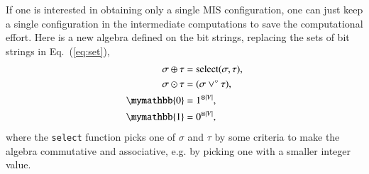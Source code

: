 \documentclass[onefignum, onetabnum]{siamart190516}
\newcommand{\<}{\langle}
\renewcommand{\>}{\rangle}
\newcommand{\Eq}[1]{Eq.~(\ref{#1})}
\newcommand{\App}[1]{Appendix~\ref{#1}}
\begin{document}
If one is interested in obtaining only a single MIS configuration, one can just keep a single configuration in the intermediate computations to save the computational effort.
Here is a new algebra defined on the bit strings, replacing the sets of bit strings in \Eq{eq:set}, 
%
\begin{equation}
\begin{split}
    \sigma \oplus \tau &= {\rm select}(\sigma, \tau), \\
    \sigma \odot \tau &= (\sigma\lor^\circ \tau),\\
    \mymathbb{0} &= 1^{\otimes |V|}, \\
    \mymathbb{1} &= 0^{\otimes |V|},
\end{split}\label{eq:singleconfig}
\end{equation}
where the \texttt{select} function picks one of $\sigma$ and $\tau$ by some criteria to make the algebra commutative and associative, e.g. by picking one with a smaller integer value.

\end{document}
